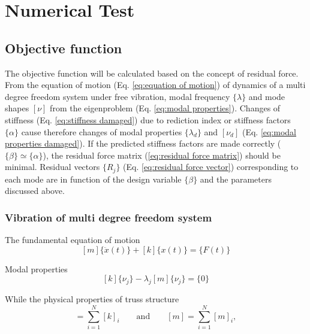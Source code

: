 \chapter{Numerical Test}
\thispagestyle{empty}

\section{Objective function}

The objective function will be calculated based on the concept of residual force. From the equation of motion (Eq. \ref{eq:equation of motion}) of dynamics of a multi degree freedom system under free vibration, modal frequency $\{\lambda\}$ and mode shapes $[\nu]$ from the eigenproblem (Eq. \ref{eq:modal properties}). Changes of stiffness (Eq. \ref{eq:stiffness damaged}) due to rediction index or stiffness factors $\{\alpha\}$ cause therefore changes of modal properties $\{\lambda_d\}$ and $[\nu_d]$ (Eq. \ref{eq:modal properties damaged}).  If the predicted stiffness factors are made correctly ($\{\beta\}\simeq\{\alpha\}$), the residual force matrix (\ref{eq:residual force matrix})  should be minimal. Residual vectors $\{R_j\}$ (Eq. \ref{eq:residual force vector}) corresponding to each mode are in function of the design variable $\{\beta\}$ and the parameters discussed above.

\subsection*{Vibration of multi degree freedom system}

The fundamental equation of motion
\begin{equation}
\label{eq:equation of motion}
[m]\{\ddot{x}(t)\}+[k]\{x(t)\} = \{F(t)\}
\end{equation}

Modal properties
\begin{equation}
\label{eq:modal properties}
[k]\{\nu_j\}-\lambda_j[m]\{\nu_j\} = \{0\}
\end{equation}

While the physical properties of truss structure 
\begin{equation}
[k] = \sum_{i=1}^N{[k]_i} \qquad \mathrm{and} \qquad [m] = \sum_{i=1}^N{[m]_i}, 
\end{equation}


